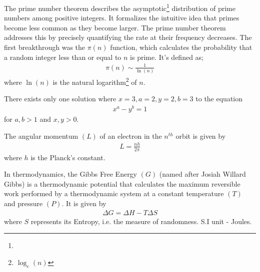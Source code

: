 \documentclass{article}
\begin{document}
\begin{mathbox}
The prime number theorem describes the asymptotic\footnote[1]{} distribution of prime numbers among positive integers. It formalizes the intuitive idea that primes become less common as they become larger. The prime number theorem addresses this by precisely quantifying the rate at their frequency decreases. The first breakthrough was the $\pi(n)$ function, which calculates the probability that a random integer less than or equal to $n$ is prime. It's defined as;
\begin{align*}
    \pi(n) \sim \frac{1}{\ln(n)}
\end{align*}
where $\ln (n)$ is the natural logarithm\footnote{$\log_e(n)$} of $n$.
\end{mathbox}
\begin{mathbox}
There exists only {one solution} where $x=3, a=2, y=2, b=3$ to the equation
\begin{align*} 
    x^a - y^b = 1
\end{align*} 
for {$a,b > 1$} and {$x,y > 0$}.
\end{mathbox}
\begin{phybox}
The {angular momentum} $(L)$ of an {electron} in the $n^{th}$ orbit is given by 
\begin{align*} 
    L = \frac{nh}{2\pi} 
\end{align*} where $h$ is the {Planck's constant}. 
\end{phybox}
\begin{chembox}
In thermodynamics, the {Gibbs Free Energy} $(G)$ (named after Josiah Willard Gibbs) is a {thermodynamic potential} that calculates the {maximum reversible work} performed by a thermodynamic system at a {constant temperature} $(T)$ and pressure{} $(P)$. It is given by 
\begin{align*} 
    \Delta G=\Delta H-T\Delta S 
\end{align*} where $S$ represents its {Entropy}, i.e. the measure of randomness. {S.I unit - Joules}.
\end{chembox}
\end{document}
